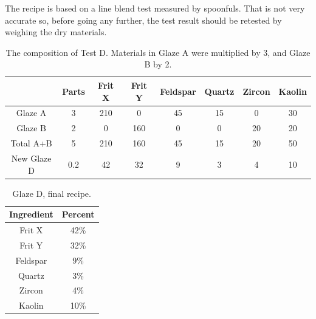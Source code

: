 The recipe is based on a line blend test measured by spoonfuls. That is not 
very accurate so, before going any further, the test result should be retested 
by weighing the dry materials.
\begin{landscape}
  \begin{center}
  \renewcommand{\arraystretch}{1.5}
  \begin{table}\centering
    \begin{tabular}{|c||c|c|c|c|c|c|c|}\hline
      &\textbf{Parts}&\textbf{Frit X}&\textbf{Frit 
      Y}&\textbf{Feldspar}&\textbf{Quartz}&\textbf{Zircon}&\textbf{Kaolin}\\\hline\hline
      Glaze A&3&210&0&45&15&0&30\\\hline
      Glaze B&2&0&160&0&0&20&20\\\hline
      Total A+B&5&210&160&45&15&20&50\\\hline\hline
      New Glaze D&0.2&42&32&9&3&4&10\\\hline
    \end{tabular}
    \caption{The composition of Test D. Materials in Glaze A were multiplied by 
    3, and Glaze B by 2.}
    \label{tab:lineblendtestd}
  \end{table}
\end{center}
\end{landscape}
\begin{center}
  \renewcommand{\arraystretch}{1.5}
  \begin{table}\centering
    \begin{tabular}{|c|c|}\hline
      \textbf{Ingredient}&\textbf{Percent}\\\hline\hline
      Frit X&42\%\\\hline
      Frit Y&32\%\\\hline
      Feldspar&9\%\\\hline
      Quartz&3\%\\\hline
      Zircon&4\%\\\hline
      Kaolin&10\%\\\hline
    \end{tabular}
    \caption{Glaze D, final recipe.}
    \label{tab:lineblendglazed}
  \end{table}
\end{center}
